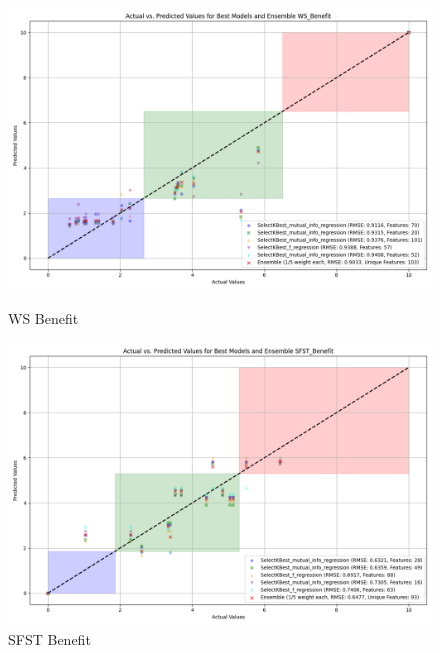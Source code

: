 \begin{figure}[H]
    \centering
    \begin{minipage}{0.45\textwidth}
        \centering
        \includegraphics[width=\linewidth]{reg_section_all/images_reg_featred_ensemble/actual_vs_predicted_best_feature_selection_and_ensemble_WS_Benefit.png}
        \caption{WS Benefit}
        \label{fig:ws_ben_reg_featred_best_ensemble}
    \end{minipage}\hfill
    \begin{minipage}{0.45\textwidth}
        \centering
        \includegraphics[width=\linewidth]{reg_section_all/images_reg_featred_ensemble/actual_vs_predicted_best_feature_selection_and_ensemble_SFST_Benefit.png}
        \caption{SFST Benefit}
        \label{fig:sfst_ben_reg_featred_best_ensemble}
    \end{minipage}
\end{figure}

